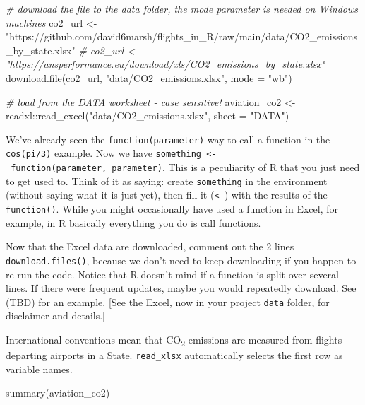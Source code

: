 \documentclass[
]{book}
\newenvironment{Shaded}{\begin{snugshade}}{\end{snugshade}}
\newcommand{\AttributeTok}[1]{\textcolor[rgb]{0.77,0.63,0.00}{#1}}
\newcommand{\CommentTok}[1]{\textcolor[rgb]{0.56,0.35,0.01}{\textit{#1}}}
\newcommand{\FunctionTok}[1]{\textcolor[rgb]{0.00,0.00,0.00}{#1}}
\newcommand{\NormalTok}[1]{#1}
\newcommand{\OtherTok}[1]{\textcolor[rgb]{0.56,0.35,0.01}{#1}}
\newcommand{\SpecialCharTok}[1]{\textcolor[rgb]{0.00,0.00,0.00}{#1}}
\newcommand{\StringTok}[1]{\textcolor[rgb]{0.31,0.60,0.02}{#1}}
\begin{document}
\begin{Shaded}
\begin{Highlighting}[]
\CommentTok{\# download the file to the data folder, the \textquotesingle{}mode\textquotesingle{} parameter is needed on Windows machines}
\NormalTok{co2\_url }\OtherTok{\textless{}{-}} \StringTok{"https://github.com/david6marsh/flights\_in\_R/raw/main/data/CO2\_emissions\_by\_state.xlsx"}
\CommentTok{\# co2\_url \textless{}{-} "https://ansperformance.eu/download/xls/CO2\_emissions\_by\_state.xlsx"}
\FunctionTok{download.file}\NormalTok{(co2\_url, }\StringTok{"data/CO2\_emissions.xlsx"}\NormalTok{, }\AttributeTok{mode =} \StringTok{"wb"}\NormalTok{)}

  
\CommentTok{\# load from the DATA worksheet {-} case sensitive!}
\NormalTok{aviation\_co2 }\OtherTok{\textless{}{-}}\NormalTok{ readxl}\SpecialCharTok{::}\FunctionTok{read\_excel}\NormalTok{(}\StringTok{"data/CO2\_emissions.xlsx"}\NormalTok{, }
                                  \AttributeTok{sheet =} \StringTok{"DATA"}\NormalTok{) }
\end{Highlighting}
\end{Shaded}

We've already seen the \texttt{function(parameter)} way to call a function in the \texttt{cos(pi/3)} example. Now we have \texttt{something\ \textless{}-\ function(parameter,\ parameter)}. This is a peculiarity of R that you just need to get used to. Think of it as saying: create \texttt{something} in the environment (without saying what it is just yet), then fill it (\texttt{\textless{}-}) with the results of the \texttt{function()}. While you might occasionally have used a function in Excel, for example, in R basically everything you do is call functions.

Now that the Excel data are downloaded, comment out the 2 lines \texttt{download.files()}, because we don't need to keep downloading if you happen to re-run the code. Notice that R doesn't mind if a function is split over several lines. If there were frequent updates, maybe you would repeatedly download. See (TBD) for an example. {[}See the Excel, now in your project \texttt{data} folder, for disclaimer and details.{]}

International conventions mean that CO\textsubscript{2} emissions are measured from flights departing airports in a State. \texttt{read\_xlsx} automatically selects the first row as variable names.

\begin{Shaded}
\begin{Highlighting}[]
\FunctionTok{summary}\NormalTok{(aviation\_co2)}
\end{Highlighting}
\end{Shaded}
\end{document}
